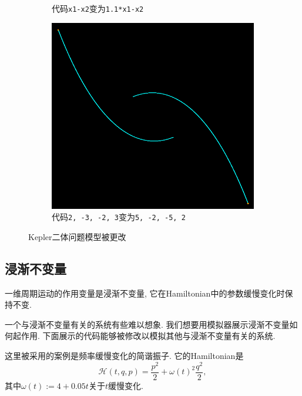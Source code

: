 \documentclass[12pt]{article}
\begin{document}
\begin{figure}[h]
\begin{subfigure}[b]{0.4\linewidth}
    \caption{代码\texttt{x1-x2}变为\texttt{1.1*x1-x2}}
  \end{subfigure}
  \begin{subfigure}[b]{0.6\linewidth}
    \includegraphics[width=\linewidth]{distortion3_kepler.png}
    \caption{代码\texttt{2, -3, -2, 3}变为\texttt{5, -2, -5, 2}}
  \end{subfigure}
  \caption{Kepler二体问题模型被更改}
  \label{fig:distortion_kepler}
\end{figure}

\subsection{浸渐不变量}

一维周期运动的作用变量是浸渐不变量,
它在Hamiltonian中的参数缓慢变化时保持不变\cite[p. 298]{arnold1989mathmech}\cite[p. 156]{landau1976mechanics}.

一个与浸渐不变量有关的系统有些难以想象.
我们想要用模拟器展示浸渐不变量如何起作用.
下面展示的代码能够被修改以模拟其他与浸渐不变量有关的系统.

这里被采用的案例是频率缓慢变化的简谐振子.
它的Hamiltonian是
\begin{equation*}
  \mathcal H\left(t,q,p\right)=\frac{p^2}2+\omega\left(t\right)^2\frac{q^2}2,
\end{equation*}
其中$\omega\left(t\right):=4+0.05t$关于$t$缓慢变化.
\end{document}
